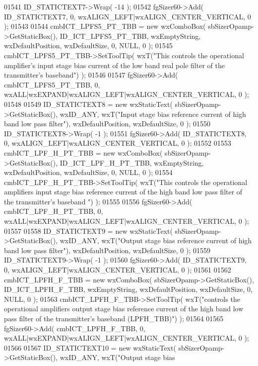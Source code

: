 \begin{DoxyCode}
01541     ID_STATICTEXT7->Wrap( -14 );
01542     fgSizer60->Add( ID_STATICTEXT7, 0, wxALIGN\_LEFT|wxALIGN\_CENTER\_VERTICAL, 0 );
01543     
01544     cmbICT_LPFS5_PT_TBB = \textcolor{keyword}{new} wxComboBox( sbSizerOpamp->GetStaticBox(), 
      ID_ICT_LPFS5_PT_TBB, wxEmptyString, wxDefaultPosition, wxDefaultSize, 0, NULL, 0 ); 
01545     cmbICT_LPFS5_PT_TBB->SetToolTip( wxT(\textcolor{stringliteral}{"This controls the operational amplifier's input stage bias
       current of the low band real pole filter of the transmitter's baseband"}) );
01546     
01547     fgSizer60->Add( cmbICT_LPFS5_PT_TBB, 0, wxALL|wxEXPAND|wxALIGN\_LEFT|wxALIGN\_CENTER\_VERTICAL, 0 );
01548     
01549     ID_STATICTEXT8 = \textcolor{keyword}{new} wxStaticText( sbSizerOpamp->GetStaticBox(), wxID\_ANY, wxT(\textcolor{stringliteral}{"Input stage bias
       reference current of high band low pass filter"}), wxDefaultPosition, wxDefaultSize, 0 );
01550     ID_STATICTEXT8->Wrap( -1 );
01551     fgSizer60->Add( ID_STATICTEXT8, 0, wxALIGN\_LEFT|wxALIGN\_CENTER\_VERTICAL, 0 );
01552     
01553     cmbICT_LPF_H_PT_TBB = \textcolor{keyword}{new} wxComboBox( sbSizerOpamp->GetStaticBox(), 
      ID_ICT_LPF_H_PT_TBB, wxEmptyString, wxDefaultPosition, wxDefaultSize, 0, NULL, 0 ); 
01554     cmbICT_LPF_H_PT_TBB->SetToolTip( wxT(\textcolor{stringliteral}{"This controls the operational amplifiers input stage bias
       reference current of the high band low pass filter of the transmitter's baseband "}) );
01555     
01556     fgSizer60->Add( cmbICT_LPF_H_PT_TBB, 0, wxALL|wxEXPAND|wxALIGN\_LEFT|wxALIGN\_CENTER\_VERTICAL, 0 );
01557     
01558     ID_STATICTEXT9 = \textcolor{keyword}{new} wxStaticText( sbSizerOpamp->GetStaticBox(), wxID\_ANY, wxT(\textcolor{stringliteral}{"Output stage bias
       reference current of high band low pass filter"}), wxDefaultPosition, wxDefaultSize, 0 );
01559     ID_STATICTEXT9->Wrap( -1 );
01560     fgSizer60->Add( ID_STATICTEXT9, 0, wxALIGN\_LEFT|wxALIGN\_CENTER\_VERTICAL, 0 );
01561     
01562     cmbICT_LPFH_F_TBB = \textcolor{keyword}{new} wxComboBox( sbSizerOpamp->GetStaticBox(), 
      ID_ICT_LPFH_F_TBB, wxEmptyString, wxDefaultPosition, wxDefaultSize, 0, NULL, 0 ); 
01563     cmbICT_LPFH_F_TBB->SetToolTip( wxT(\textcolor{stringliteral}{"controls the operational amplifiers output stage bias reference
       current of the high band low pass filter of the transmitter's baseband (LPFH\_TBB)"}) );
01564     
01565     fgSizer60->Add( cmbICT_LPFH_F_TBB, 0, wxALL|wxEXPAND|wxALIGN\_LEFT|wxALIGN\_CENTER\_VERTICAL, 0 );
01566     
01567     ID_STATICTEXT10 = \textcolor{keyword}{new} wxStaticText( sbSizerOpamp->GetStaticBox(), wxID\_ANY, wxT(\textcolor{stringliteral}{"Output stage bias
}
\end{DoxyCode}
